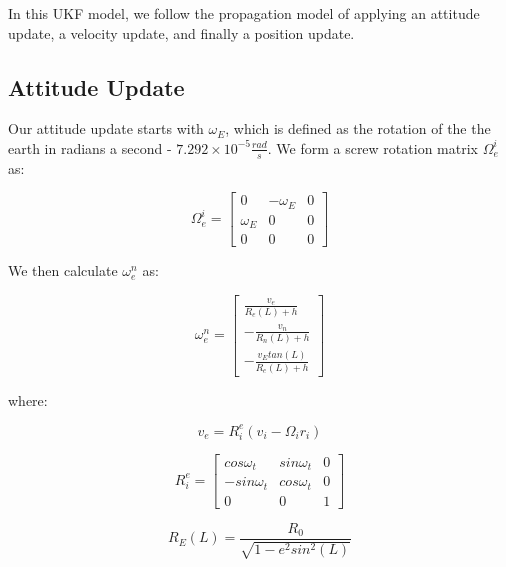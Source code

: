 \documentclass{article}
\begin{document}
In this UKF model, we follow the propagation model of applying an attitude update, a velocity update, and finally a position update.

\subsection*{Attitude Update}

Our attitude update starts with $\omega_E$, which is defined as the rotation of the the earth in radians a second - $7.292 \times 10^{-5} \frac{rad}{s}$. We form a screw rotation matrix $\Omega^i_e$ as:

\begin{equation}
    \Omega^i_e = \begin{bmatrix} 0        & -\omega_E & 0 \\
                \omega_E & 0         & 0 \\
                0        & 0         & 0
    \end{bmatrix}
\end{equation}

We then calculate $\omega^n_e$ as:

\begin{equation}
    \omega^n_e = \begin{bmatrix}
        \frac{v_e}{R_e(L) + h}  \\
        -\frac{v_n}{R_n(L) + h} \\
        -\frac{v_E tan(L)}{R_e(L) + h}
    \end{bmatrix}
\end{equation}

where:

\begin{equation}
    v_e = R^e_i(v_i-\Omega_i r_i)
\end{equation}

\begin{equation}
    R^e_i = \begin{bmatrix}
        cos \omega_t  & sin \omega_t & 0 \\
        -sin \omega_t & cos \omega_t & 0 \\
        0             & 0            & 1
    \end{bmatrix}
\end{equation}

\begin{equation}
    R_E(L) = \frac{R_0}{\sqrt{1 - e^2 sin^2(L)}}
\end{equation}
\end{document}
